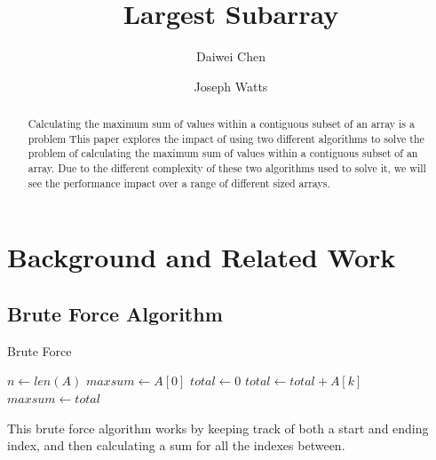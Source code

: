 \documentclass[10pt, letterpaper]{article}
\title{Largest Subarray}
\author{Daiwei Chen \and Joseph Watts}
\begin{document}
	\maketitle
	\begin{abstract}
		Calculating the maximum sum of values within a contiguous subset of an array is a problem 
		This paper explores the impact of using two different algorithms to solve the problem of calculating the maximum sum of values within a contiguous subset of an array.
		Due to the different complexity of these two algorithms used to solve it, 
		we will see the performance impact over a range of different sized arrays.
	\end{abstract}
	\section{Background and Related Work}

	\subsection{Brute Force Algorithm}

	\begin{algorithm}
	\begin{algorithmic}
		\caption{Brute Force}\label{bruteforce}
	\State $n\gets len(A)$
	\State $maxsum\gets A[0]$
	\State $total\gets 0$
	\State $total\gets total + A[k]$
	\EndFor
	\State $maxsum\gets total$
	\EndIf
	\EndFor
	\EndFor
	\EndFunction
	\end{algorithmic}
	\end{algorithm}


	This brute force algorithm works by keeping track of both a start and ending index, and then calculating a sum for all the indexes between.
\end{document}
